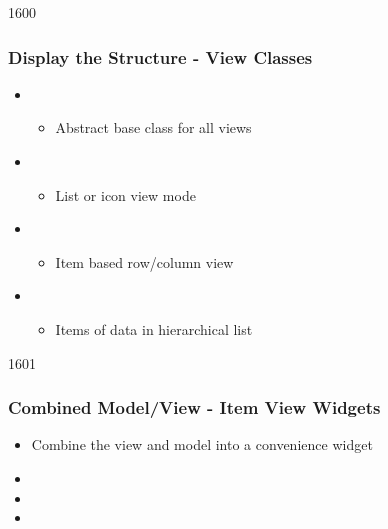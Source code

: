 \begin{slide}{1600}\frametitle{Display the Structure - View Classes}
\begin{itemize}
 \item {}
   \begin{itemize}
   \item Abstract base class for all views
   \end{itemize}
\item {}
  \begin{itemize}
  \item List or icon view mode
  \end{itemize}
\item {}
  \begin{itemize}
  \item Item based row/column view
  \end{itemize}
\item {}
  \begin{itemize}
  \item Items of data in hierarchical list
  \end{itemize}
\end{itemize}
\end{slide}

\begin{slide}{1601}\frametitle{Combined Model/View - Item View Widgets}
\begin{itemize}
\item Combine the view and model into a convenience widget
\item {}
\item {}
\item {}
\end{itemize}
\end{slide}



